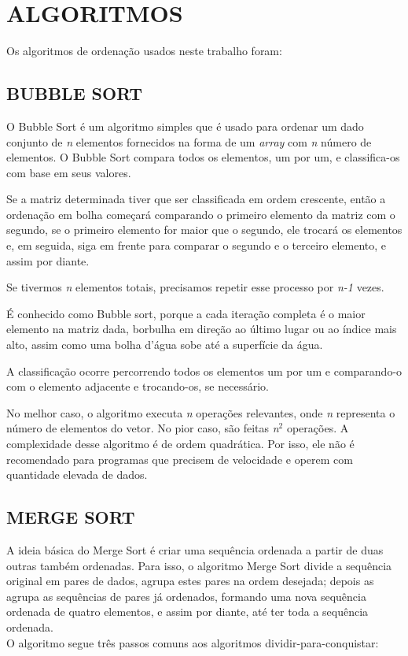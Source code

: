 \section{\normalsize ALGORITMOS}
	Os algoritmos de ordenação usados neste trabalho foram:
	
	\subsection{\normalsize BUBBLE SORT}
		O Bubble Sort é um algoritmo simples que é usado para ordenar um dado conjunto de \textit{n} elementos fornecidos na forma de um \textit{array} com \textit{n} número de elementos. O Bubble Sort compara todos os elementos, um por um, e classifica-os com base em seus valores.

		Se a matriz determinada tiver que ser classificada em ordem crescente, então a ordenação em bolha começará comparando o primeiro elemento da matriz com o segundo, se o primeiro elemento for maior que o segundo, ele trocará os elementos e, em seguida, siga em frente para comparar o segundo e o terceiro elemento, e assim por diante.

		Se tivermos \textit{n} elementos totais, precisamos repetir esse processo por \textit{n-1} vezes.

		É conhecido como Bubble sort, porque a cada iteração completa é o maior elemento na matriz dada, borbulha em direção ao último lugar ou ao índice mais alto, assim como uma bolha d'água sobe até a superfície da água.

		A classificação ocorre percorrendo todos os elementos um por um e comparando-o com o elemento adjacente e trocando-os, se necessário.

		No melhor caso, o algoritmo executa \textit{n} operações relevantes, onde \textit{n} representa o número de elementos do vetor. No pior caso, são feitas \textit{n}$^{2}$ operações. A complexidade desse algoritmo é de ordem quadrática. Por isso, ele não é recomendado para programas que precisem de velocidade e operem com quantidade elevada de dados.
	
	\subsection{\normalsize MERGE SORT}
		A ideia básica do Merge Sort é criar uma sequência ordenada a partir de duas outras também ordenadas. Para isso, o algoritmo Merge Sort divide a sequência original em pares de dados, agrupa estes pares na ordem desejada; depois as agrupa as sequências de pares já ordenados, formando uma nova sequência ordenada de quatro elementos, e assim por diante, até ter toda a sequência ordenada.\\
		O algoritmo segue três passos comuns aos algoritmos dividir-para-conquistar:
		
